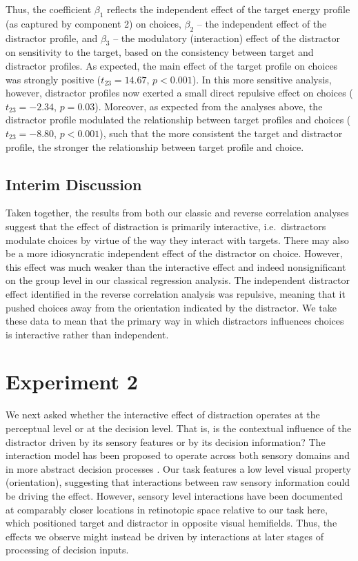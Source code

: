 \documentclass[a4paper, nobind]{templates/ociamthesis}
\begin{document}
Thus, the coefficient \(\beta_1\) reflects the independent effect of the target energy profile (as captured by component 2) on choices, \(\beta_2\) -- the independent effect of the distractor profile, and \(\beta_3\) -- the modulatory (interaction) effect of the distractor on sensitivity to the target, based on the consistency between target and distractor profiles. As expected, the main effect of the target profile on choices was strongly positive (\(t_{23}=14.67\), \(p<0.001\)). In this more sensitive analysis, however, distractor profiles now exerted a small direct repulsive effect on choices (\(t_{23}=-2.34\), \(p=0.03\)). Moreover, as expected from the analyses above, the distractor profile modulated the relationship between target profiles and choices (\(t_{23}=-8.80\), \(p<0.001\)), such that the more consistent the target and distractor profile, the stronger the relationship between target profile and choice.

\hypertarget{interim-discussion-2}{%
\subsection{Interim Discussion}\label{interim-discussion-2}}

Taken together, the results from both our classic and reverse correlation analyses suggest that the effect of distraction is primarily interactive, i.e.~distractors modulate choices by virtue of the way they interact with targets. There may also be a more idiosyncratic independent effect of the distractor on choice. However, this effect was much weaker than the interactive effect and indeed nonsignificant on the group level in our classical regression analysis. The independent distractor effect identified in the reverse correlation analysis was repulsive, meaning that it pushed choices away from the orientation indicated by the distractor. We take these data to mean that the primary way in which distractors influences choices is interactive rather than independent.

\hypertarget{experiment-2}{%
\section{Experiment 2}\label{experiment-2}}

We next asked whether the interactive effect of distraction operates at the perceptual level or at the decision level. That is, is the contextual influence of the distractor driven by its sensory features or by its decision information? The interaction model has been proposed to operate across both sensory domains \autocite[e.g.~in visual cortex,][]{kapadia1995} and in more abstract decision processes \autocite[e.g.~about value-based information,][]{louie2013}. Our task features a low level visual property (orientation), suggesting that interactions between raw sensory information could be driving the effect. However, sensory level interactions have been documented at comparably closer locations in retinotopic space \autocite{polat1994} relative to our task here, which positioned target and distractor in opposite visual hemifields. Thus, the effects we observe might instead be driven by interactions at later stages of processing of decision inputs.
\end{document}
